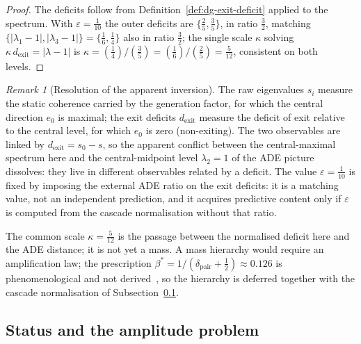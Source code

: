 \documentclass[11pt,a4paper]{article}
\theoremstyle{definition}
\theoremstyle{remark}
\newtheorem{remark}[theorem]{Remark}
\begin{document}
    \begin{proof}
      The deficits follow from Definition~\ref{def:dg-exit-deficit} applied to the spectrum.
      With $\varepsilon = \tfrac1{10}$ the outer deficits are $\{\tfrac25, \tfrac35\}$, in ratio
      $\tfrac32$, matching $\{|\lambda_1 - 1|, |\lambda_3 - 1|\} = \{\tfrac16, \tfrac14\}$ also in
      ratio $\tfrac32$; the single scale $\kappa$ solving $\kappa\, d_{\mathrm{exit}} = |\lambda - 1|$
      is $\kappa = (\tfrac14)/(\tfrac35) = (\tfrac16)/(\tfrac25) = \tfrac{5}{12}$, consistent on both
      levels.
    \end{proof}

    \begin{remark}[Resolution of the apparent inversion]
      \label{rem:dg-inversion}
      The raw eigenvalues $s_i$ measure the static coherence carried by the generation factor, for
      which the central direction $e_0$ is maximal; the exit deficits $d_{\mathrm{exit}}$ measure the
      deficit of exit relative to the central level, for which $e_0$ is zero (non-exiting).
      The two observables are linked by $d_{\mathrm{exit}} = s_0 - s$, so the apparent conflict
      between the central-maximal spectrum here and the central-midpoint level $\lambda_2 = 1$ of the
      ADE picture dissolves: they live in different observables related by a deficit.
      The value $\varepsilon = \tfrac1{10}$ is fixed by imposing the external ADE ratio on the exit
      deficits: it is a matching value, not an independent prediction, and it acquires predictive
      content only if $\varepsilon$ is computed from the cascade normalisation without that ratio.
    \end{remark}

    The common scale $\kappa = \tfrac{5}{12}$ is the passage between the normalised deficit here and
    the ADE distance; it is not yet a mass.
    A mass hierarchy would require an amplification law; the prescription
    $\beta^* = 1/(\delta_{\mathrm{pair}} + \tfrac12) \approx 0.126$ is phenomenological and not
    derived~\cite{Beau2026a26}, so the hierarchy is deferred together with the cascade normalisation of
    Subsection~\ref{ssec:dg-status}.

  \subsection{Status and the amplitude problem}
    \label{ssec:dg-status}
\end{document}
